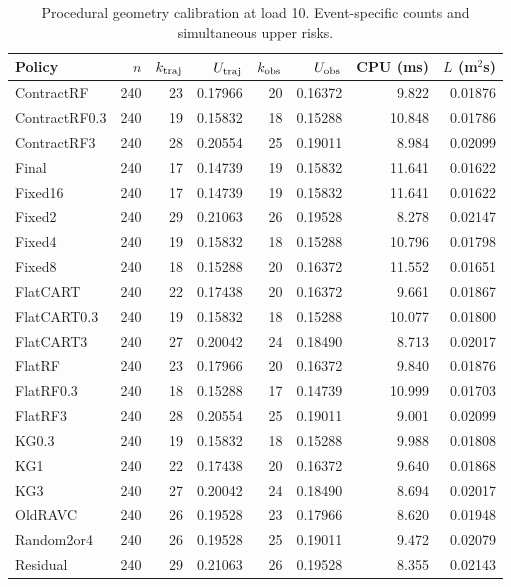 \begin{table}[!htbp]\centering\footnotesize
\caption{Procedural geometry calibration at load 10. Event-specific counts and simultaneous upper risks.}\label{supp:calgeometry_calibration10}
\begin{tabular}{@{}lrrrrrrr@{}}\toprule
Policy & $n$ & $k_{\rm traj}$ & $U_{\rm traj}$ & $k_{\rm obs}$ & $U_{\rm obs}$ & CPU (ms) & $L$ (m$^2$s)\\\midrule
ContractRF & 240 & 23 & 0.17966 & 20 & 0.16372 & 9.822 & 0.01876\\
ContractRF0.3 & 240 & 19 & 0.15832 & 18 & 0.15288 & 10.848 & 0.01786\\
ContractRF3 & 240 & 28 & 0.20554 & 25 & 0.19011 & 8.984 & 0.02099\\
Final & 240 & 17 & 0.14739 & 19 & 0.15832 & 11.641 & 0.01622\\
Fixed16 & 240 & 17 & 0.14739 & 19 & 0.15832 & 11.641 & 0.01622\\
Fixed2 & 240 & 29 & 0.21063 & 26 & 0.19528 & 8.278 & 0.02147\\
Fixed4 & 240 & 19 & 0.15832 & 18 & 0.15288 & 10.796 & 0.01798\\
Fixed8 & 240 & 18 & 0.15288 & 20 & 0.16372 & 11.552 & 0.01651\\
FlatCART & 240 & 22 & 0.17438 & 20 & 0.16372 & 9.661 & 0.01867\\
FlatCART0.3 & 240 & 19 & 0.15832 & 18 & 0.15288 & 10.077 & 0.01800\\
FlatCART3 & 240 & 27 & 0.20042 & 24 & 0.18490 & 8.713 & 0.02017\\
FlatRF & 240 & 23 & 0.17966 & 20 & 0.16372 & 9.840 & 0.01876\\
FlatRF0.3 & 240 & 18 & 0.15288 & 17 & 0.14739 & 10.999 & 0.01703\\
FlatRF3 & 240 & 28 & 0.20554 & 25 & 0.19011 & 9.001 & 0.02099\\
KG0.3 & 240 & 19 & 0.15832 & 18 & 0.15288 & 9.988 & 0.01808\\
KG1 & 240 & 22 & 0.17438 & 20 & 0.16372 & 9.640 & 0.01868\\
KG3 & 240 & 27 & 0.20042 & 24 & 0.18490 & 8.694 & 0.02017\\
OldRAVC & 240 & 26 & 0.19528 & 23 & 0.17966 & 8.620 & 0.01948\\
Random2or4 & 240 & 26 & 0.19528 & 25 & 0.19011 & 9.472 & 0.02079\\
Residual & 240 & 29 & 0.21063 & 26 & 0.19528 & 8.355 & 0.02143\\
\bottomrule\end{tabular}\end{table}

